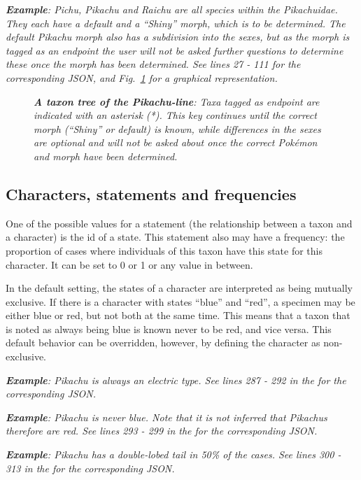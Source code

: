\documentclass[10pt,letterpaper]{article}
\begin{document}
\textit{\textbf{Example}: Pichu, Pikachu and Raichu are all species within the Pikachuidae. They each have a default and a ``Shiny'' morph, which is to be determined. The default Pikachu morph also has a subdivision into the sexes, but as the morph is tagged as an endpoint the user will not be asked further questions to determine these once the morph has been determined. See lines 27 - 111  for the corresponding JSON, and Fig.~\ref{fig3} for a graphical representation.}


\begin{figure}[!h]
  \caption{\textit{\textbf{A taxon tree of the Pikachu-line}:
Taxa tagged as endpoint are indicated with an asterisk (*). This key continues until the correct morph (``Shiny'' or default) is known, while differences in the sexes are optional and will not be asked about once the correct Pokémon and morph have been determined.
  }}
  \label{fig3}
\end{figure}
\subsection*{
Characters, statements and frequencies
}
One of the possible values for a statement (the relationship between a taxon and a character) is the id of a state. This statement also may have a frequency: the proportion of cases where individuals of this taxon have this state for this character. It can be set to 0 or 1 or any value in between.

In the default setting, the states of a character are interpreted as being mutually exclusive. If there is a character with states ``blue'' and ``red'', a specimen may be either blue or red, but not both at the same time. This means that a taxon that is noted as always being blue is known never to be red, and vice versa. This default behavior can be overridden, however, by defining the character as non-exclusive.


\textit{\textbf{Example}: Pikachu is always an electric type. See lines 287 - 292 in the  for the corresponding JSON.}


\textit{\textbf{Example}: Pikachu is never blue. Note that it is not inferred that Pikachus therefore are red. See lines 293 - 299 in the  for the corresponding JSON.}


\textit{\textbf{Example}: Pikachu has a double-lobed tail in 50\% of the cases. See lines 300 - 313 in the  for the corresponding JSON.}
\end{document}
